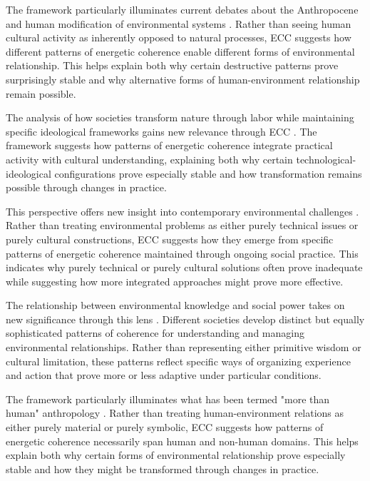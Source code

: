 The framework particularly illuminates current debates about the Anthropocene and human modification of environmental systems \cite{tsing2015mushroom}. Rather than seeing human cultural activity as inherently opposed to natural processes, ECC suggests how different patterns of energetic coherence enable different forms of environmental relationship. This helps explain both why certain destructive patterns prove surprisingly stable and why alternative forms of human-environment relationship remain possible.

The analysis of how societies transform nature through labor while maintaining specific ideological frameworks gains new relevance through ECC \cite{latour1993modern}. The framework suggests how patterns of energetic coherence integrate practical activity with cultural understanding, explaining both why certain technological-ideological configurations prove especially stable and how transformation remains possible through changes in practice.

This perspective offers new insight into contemporary environmental challenges \cite{tsing2015mushroom}. Rather than treating environmental problems as either purely technical issues or purely cultural constructions, ECC suggests how they emerge from specific patterns of energetic coherence maintained through ongoing social practice. This indicates why purely technical or purely cultural solutions often prove inadequate while suggesting how more integrated approaches might prove more effective.

The relationship between environmental knowledge and social power takes on new significance through this lens \cite{palsson2015nature}. Different societies develop distinct but equally sophisticated patterns of coherence for understanding and managing environmental relationships. Rather than representing either primitive wisdom or cultural limitation, these patterns reflect specific ways of organizing experience and action that prove more or less adaptive under particular conditions.

The framework particularly illuminates what has been termed "more than human" anthropology \cite{kohn2013forests}. Rather than treating human-environment relations as either purely material or purely symbolic, ECC suggests how patterns of energetic coherence necessarily span human and non-human domains. This helps explain both why certain forms of environmental relationship prove especially stable and how they might be transformed through changes in practice.

